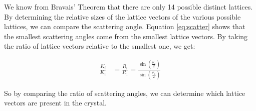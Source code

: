 \documentclass[12pt]{article}
\begin{document}
We know from Bravais' Theorem that there are only 14 possible distinct lattices.  By determining the relative sizes of the lattice vectors of the various possible lattices, we can compare the scattering angle.  Equation \ref{eq:scatter} shows that the smallest scattering angles  come from the smallest lattice vectors.  By taking the ratio of lattice vectors relative to the smallest one, we get:

\begin{align}
	\frac{K_i}{K_1} &= \frac{R_i}{R_1} =  \frac{\sin(\frac{\varphi_i}{2})}{\sin(\frac{\varphi_1}{2})} \label{eq:ratio}
\end{align}

So by comparing the ratio of scattering angles, we can determine which lattice vectors are present in the crystal.




\end{document}

